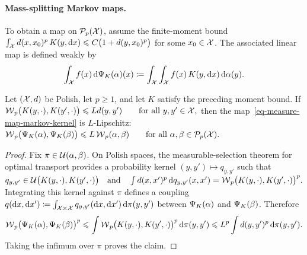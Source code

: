 \paragraph{Mass-splitting Markov maps.}
To obtain a map on $\mathcal{P}_p(\mathcal{X})$, assume the finite-moment bound
\(\int_{\mathcal{X}} d(x,x_0)^p\,K(y,\mathrm{d} x) \leqslant C\bigl(1+d(y,x_0)^p\bigr)\)
for some $x_0\in\mathcal{X}$. The associated linear map is defined weakly by
\begin{equation}\label{eq-measure-map-markov-kernel}
\int_{\mathcal{X}} f(x)\,\mathrm{d}\Psi_K(\alpha)(x)
\coloneqq
\int_{\mathcal{X}}\int_{\mathcal{X}} f(x)\,K(y,\mathrm{d} x)\,\mathrm{d}\alpha(y).
\end{equation}
\begin{prop}\label{prop-markov-map-wasserstein-stability}
Let $(\mathcal{X},d)$ be Polish, let $p\geq1$, and let $K$ satisfy the preceding moment bound. If
\(\operatorname{\mathcal{W}}_p\bigl(K(y,\cdot),K(y',\cdot)\bigr) \leqslant Ld(y,y') \qquad\text{for all }y,y'\in\mathcal{X},\)
then the map~\eqref{eq-measure-map-markov-kernel} is $L$-Lipschitz: \(\operatorname{\mathcal{W}}_p\bigl(\Psi_K(\alpha),\Psi_K(\beta)\bigr) \leqslant L\operatorname{\mathcal{W}}_p(\alpha,\beta) \qquad\text{for all }\alpha,\beta\in\mathcal{P}_p(\mathcal{X}).\)
\end{prop}
\begin{proof}
Fix $\pi\in\mathcal{U}(\alpha,\beta)$. On Polish spaces, the measurable-selection theorem for optimal transport provides a probability kernel $(y,y')\mapsto q_{y,y'}$ such that
\(q_{y,y'}\in\mathcal{U}\bigl(K(y,\cdot),K(y',\cdot)\bigr) \quad \text{and} \quad \int d(x,x')^p\,\mathrm{d} q_{y,y'}(x,x') = \operatorname{\mathcal{W}}_p\bigl(K(y,\cdot),K(y',\cdot)\bigr)^p.\)
Integrating this kernel against $\pi$ defines a coupling
\(q(\mathrm{d} x,\mathrm{d} x') \coloneqq \int_{\mathcal{X}\times\mathcal{X}} q_{y,y'}(\mathrm{d} x,\mathrm{d} x')\,\mathrm{d}\pi(y,y')\)
between $\Psi_K(\alpha)$ and $\Psi_K(\beta)$. Therefore
\[
\operatorname{\mathcal{W}}_p\bigl(\Psi_K(\alpha),\Psi_K(\beta)\bigr)^p
\leqslant
\int\operatorname{\mathcal{W}}_p\bigl(K(y,\cdot),K(y',\cdot)\bigr)^p\,\mathrm{d}\pi(y,y')
\leqslant
L^p\int d(y,y')^p\,\mathrm{d}\pi(y,y').
\]
Taking the infimum over $\pi$ proves the claim.
\end{proof}
